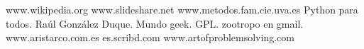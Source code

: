 \documentclass[spanish,a4paper,11pt]{report}
\begin{document}



\nocite{*}



\begin{thebibliography}{11}
www.wikipedia.org
www.slideshare.net
www.metodos.fam.cie.uva.es
Python para todos. Raúl González Duque. Mundo geek. GPL. zootropo en gmail. 
www.aristarco.com.es
es.scribd.com
www.artofproblemsolving.com



\end{thebibliography}

 
\end{document}
